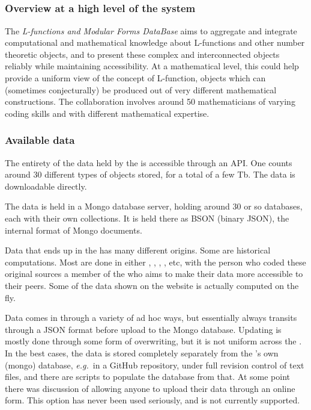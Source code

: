 \subsection{\LMFDB}

\subsubsection{Overview at a high level of the \LMFDB system}

 The \emph{L-functions and Modular Forms DataBase} \cite{lmfdb} aims to aggregate and integrate computational and mathematical knowledge about L-functions and other number theoretic objects, and to present these complex and interconnected objects reliably while maintaining accessibility. At a mathematical level, this could help provide a uniform view of the concept of L-function, objects which can (sometimes conjecturally) be produced out of very different mathematical constructions. The collaboration involves around 50 mathematicians of varying coding skills and with different mathematical expertise.

\subsubsection{Available data}
The entirety of the data held by the \LMFDB is accessible through an API. One counts around 30 different types of objects stored, for a total of a few Tb. The data is downloadable directly.

The data is held in a Mongo database server, holding around 30 or so databases, each with their own collections. It is held there as BSON (binary JSON), the internal format of Mongo documents.

Data that ends up in the \LMFDB has many different origins. Some are historical computations. Most are done in either \GAP, \Pari, \SageMath, \Magma, etc, with the person who coded these original sources a member of the \LMFDB who aims to make their data more accessible to their peers. Some of the data shown on the website is actually computed on the fly.

Data comes in through a variety of ad hoc ways, but essentially always transits through a JSON format before upload to the Mongo database. Updating is mostly done through some form of overwriting, but it is not uniform across the \LMFDB. In the best cases, the data is stored completely separately from the \LMFDB's own (mongo) database, \emph{e.g.}~in a GitHub repository, under full revision control of text files, and there are scripts to populate the database from that.
 At some point there was discussion of allowing anyone to upload their data through an online form. This option has never been used seriously, and is not currently supported.



